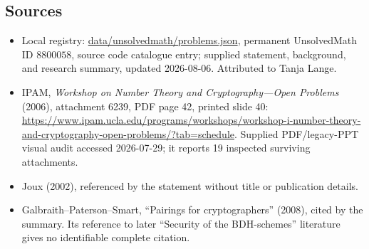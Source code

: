 \documentclass[11pt]{article}
\begin{document}
\subsection{Sources}
\begin{itemize}
\item Local registry: \url{data/unsolvedmath/problems.json}, permanent UnsolvedMath ID \(8800058\), source code catalogue entry; supplied statement, background, and research summary, updated 2026-08-06. Attributed to Tanja Lange.
\item IPAM, \emph{Workshop on Number Theory and Cryptography---Open Problems} (2006), attachment 6239, PDF page 42, printed slide 40: \url{https://www.ipam.ucla.edu/programs/workshops/workshop-i-number-theory-and-cryptography-open-problems/?tab=schedule}. Supplied PDF/legacy-PPT visual audit accessed 2026-07-29; it reports 19 inspected surviving attachments.
\item Joux (2002), referenced by the statement without title or publication details.
\item Galbraith--Paterson--Smart, ``Pairings for cryptographers'' (2008), cited by the summary. Its reference to later ``Security of the BDH-schemes'' literature gives no identifiable complete citation.
\end{itemize}
\end{document}
